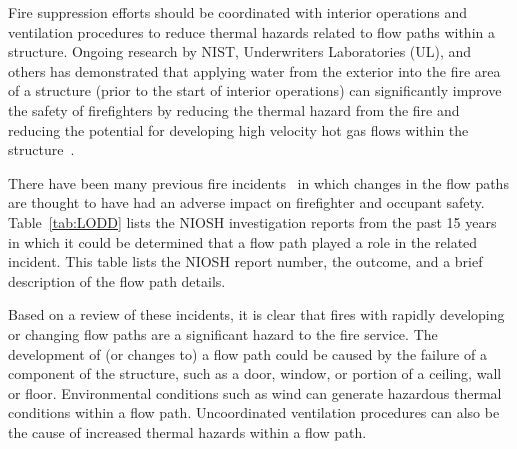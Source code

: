 \documentclass[12pt,oneside]{book}
\begin{document}
Fire suppression efforts should be coordinated with interior operations and ventilation procedures to reduce thermal hazards related to flow paths within a structure. Ongoing research by NIST, Underwriters Laboratories (UL), and others has demonstrated that applying water from the exterior into the fire area of a structure (prior to the start of interior operations) can significantly improve the safety of firefighters by reducing the thermal hazard from the fire and reducing the potential for developing high velocity hot gas flows within the structure~\cite{madrzykowski2009fire, kerber2009fire}.

There have been many previous fire incidents~\cite{NIOSH:Pettit,NIOSH:Washenitz,NIOSH:Mezzanotte,NIOSH:McFall,NIOSH:McFall2,NIOSH:McFall3,NIOSH:Berardinelli,NIOSH:Koedam,NIOSH:McFall4,NIOSH:Tarley,NIOSH:Braddee,NIOSH:Merinar,NIOSH:Bowyer2,NIOSH:Loflin,NIOSH:Bowyer} in which changes in the flow paths are thought to have had an adverse impact on firefighter and occupant safety. Table~\ref{tab:LODD} lists the NIOSH investigation reports from the past 15 years in which it could be determined that a flow path played a role in the related incident. This table lists the NIOSH report number, the outcome, and a brief description of the flow path details.

Based on a review of these incidents, it is clear that fires with rapidly developing or changing flow paths are a significant hazard to the fire service. The development of (or changes to) a flow path could be caused by the failure of a component of the structure, such as a door, window, or portion of a ceiling, wall or floor. Environmental conditions such as wind can generate hazardous thermal conditions within a flow path. Uncoordinated ventilation procedures can also be the cause of increased thermal hazards within a flow path.
\end{document}
